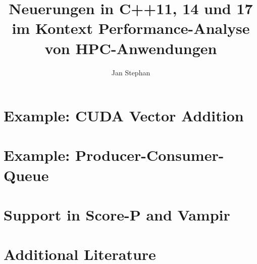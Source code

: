 \documentclass[utf8,hauptseminar]{zihpub}
\author{Jan Stephan}
\title{Neuerungen in C++11, 14 und 17 im Kontext Performance-Analyse von HPC-Anwendungen}
\begin{document}

\section{Example: CUDA Vector Addition} 
\section{Example: Producer-Consumer-Queue}
\section{Support in Score-P and Vampir}

\section{Additional Literature}

{}

\end{document}
